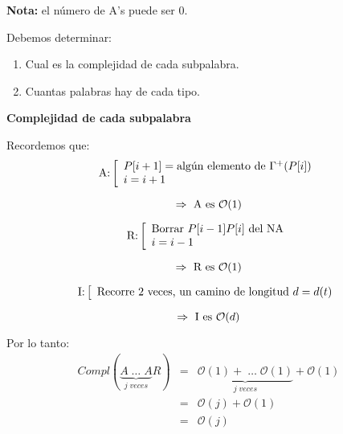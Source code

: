 \documentclass[12pt,a4paper]{report}
\begin{document}
			\par \textbf{Nota:} el número de A's puede ser 0.
			\vspace{5mm}
			\par Debemos determinar:
			\begin{enumerate}
				\item Cual es la complejidad de cada subpalabra.
				\item Cuantas palabras hay de cada tipo.
			\end{enumerate}

			\textbf{Complejidad de cada subpalabra}
				\par Recordemos que:
				\begin{equation*}
					\textup{A:}
		  		\left[
		  		\begin{array}{l}
		    		P[i + 1] = \textup{algún elemento de } \Gamma^{+}(P[i]) \\
		     		i = i + 1
		  		\end{array}
		  		\right.
				\end{equation*}

				\[ \Rightarrow \textup{ A es } \mathcal{O}(1) \]

				\begin{equation*}
					\textup{R:}
		  		\left[
		  		\begin{array}{l}
		    		\textup{Borrar } P[i - 1]P[i] \textup{ del NA} \\
		     		i = i - 1
		  		\end{array}
		  		\right.
				\end{equation*}

				\[ \Rightarrow \textup{ R es } \mathcal{O}(1) \]

				\begin{equation*}
					\textup{I:}
		  		\left[
		  		\begin{array}{l}
		    		\textup{Recorre 2 veces, un camino de longitud } d = d(t)
		  		\end{array}
		  		\right.
				\end{equation*}

				\[ \Rightarrow \textup{ I es } \mathcal{O}(d) \]

				\par Por lo tanto:
				\begin{eqnarray}
					\nonumber Compl(\underbrace{A \; \dotsc \; A}_{j \; veces}R) &=& \underbrace{\mathcal{O}(1) + \; \dotsc \; \mathcal{O}(1)}_{j \; veces} + \mathcal{O}(1) \\
					\nonumber &=& \mathcal{O}(j) + \mathcal{O}(1) \\
					\nonumber &=& \mathcal{O}(j)
				\end{eqnarray}
\end{document}
